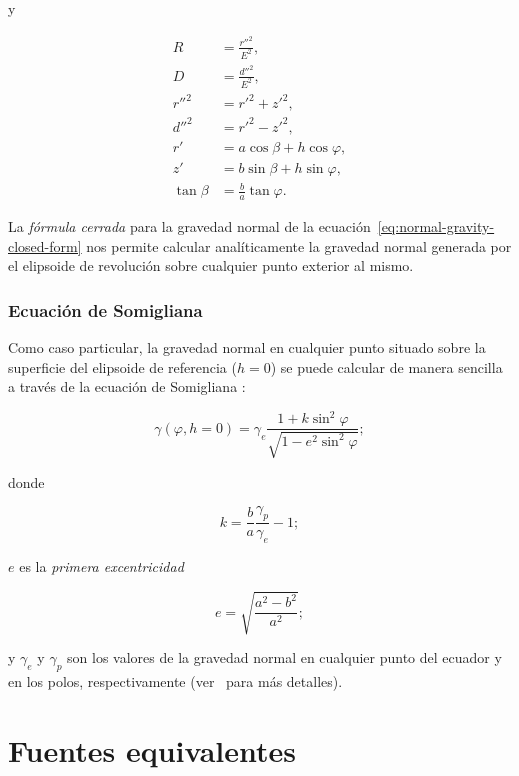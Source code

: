 \noindent y

\begin{align}
    R &= \frac{{r''}^2}{E^2}, \\
    D &= \frac{{d''}^2}{E^2}, \\
    {r''}^2 &= {r'}^2 + {z'}^2, \\
    {d''}^2 &= {r'}^2 - {z'}^2, \\
    r' &= a\cos\beta + h\cos\varphi, \\
    z' &= b\sin\beta + h\sin\varphi, \\
    \tan\beta &= \frac{b}{a}\tan\varphi.
\end{align}

La \emph{fórmula cerrada} para la gravedad normal de la
ecuación~\ref{eq:normal-gravity-closed-form} nos permite calcular
analíticamente la gravedad normal generada por el elipsoide de revolución sobre
cualquier punto exterior al mismo.

\subsubsection{Ecuación de Somigliana}

Como caso particular, la gravedad normal en cualquier punto situado sobre la
superficie del elipsoide de referencia ($h=0$) se puede calcular de manera
sencilla a través de la ecuación de Somigliana \citep{heiskanen1967}:

\begin{equation}
    \gamma(\varphi, h=0) =
        \gamma_e
        \frac{1 + k \sin^2\varphi}{\sqrt{1 - e^2 \sin^2\varphi}};
    \label{eq:somigliana}
\end{equation}

\noindent donde

\begin{equation}
    k = \frac{b}{a} \frac{\gamma_p}{\gamma_e} - 1;
\end{equation}

\noindent $e$ es la \emph{primera excentricidad}

\begin{equation}
    e = \sqrt{\frac{a^2 - b^2}{a^2}};
\end{equation}

\noindent y $\gamma_e$ y $\gamma_p$ son los valores de la gravedad normal en
cualquier punto del ecuador y en los polos, respectivamente
(ver~\citet[][p.~68--69]{heiskanen1967} para más detalles).



\section{Fuentes equivalentes}
